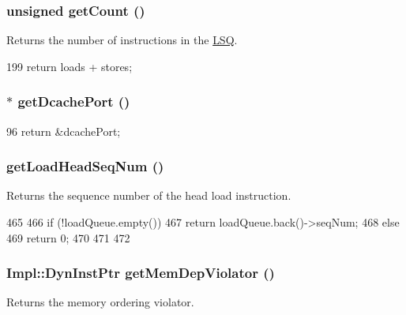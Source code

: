 \hypertarget{classOzoneLWLSQ_a24ba9cb3fa1e726321780a20a960c8cd}{
\subsubsection[{getCount}]{\setlength{\rightskip}{0pt plus 5cm}unsigned getCount ()}}
\label{classOzoneLWLSQ_a24ba9cb3fa1e726321780a20a960c8cd}
Returns the number of instructions in the \hyperlink{classLSQ}{LSQ}. 


\begin{DoxyCode}
199 { return loads + stores; }
\end{DoxyCode}
\hypertarget{classOzoneLWLSQ_a32e64f82b805fe23a17b01dda0f44fb0}{
\subsubsection[{getDcachePort}]{$\ast$ getDcachePort ()}}
\label{classOzoneLWLSQ_a32e64f82b805fe23a17b01dda0f44fb0}



\begin{DoxyCode}
96 { return &dcachePort; }
\end{DoxyCode}
\hypertarget{classOzoneLWLSQ_aee7352adadc6b43b7ce36a8c052eb222}{
\subsubsection[{getLoadHeadSeqNum}]{ getLoadHeadSeqNum ()}}
\label{classOzoneLWLSQ_aee7352adadc6b43b7ce36a8c052eb222}
Returns the sequence number of the head load instruction. 


\begin{DoxyCode}
465     {
466         if (!loadQueue.empty()) {
467             return loadQueue.back()->seqNum;
468         } else {
469             return 0;
470         }
471 
472     }
\end{DoxyCode}
\hypertarget{classOzoneLWLSQ_a30adaf6f5fb6b38b5747f35c419e3f31}{
\subsubsection[{getMemDepViolator}]{\setlength{\rightskip}{0pt plus 5cm}Impl::DynInstPtr getMemDepViolator ()}}
\label{classOzoneLWLSQ_a30adaf6f5fb6b38b5747f35c419e3f31}
Returns the memory ordering violator. 


